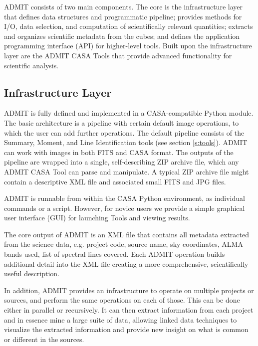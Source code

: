 \documentclass[preprint]{aastex} %
\begin{document}
ADMIT consists of two main components. The core is the infrastructure layer
that defines data structures and programmatic pipeline; provides methods
for I/O, data selection, and computation of scientifically relevant
quantities; extracts and organizes scientific metadata from the cubes; and
defines the application programming interface (API) for higher-level tools.
Built upon the infrastructure layer are the ADMIT CASA Tools that provide
advanced functionality for scientific analysis.

\subsection{ Infrastructure Layer \label{s:infrastructure} }


ADMIT is fully defined and implemented in a CASA-compatible Python module.
The basic architecture is a pipeline with certain default image operations,
to which the user can add further operations.  The default pipeline
consists of the Summary, Moment, and Line Identification tools (see section
\ref{s:tools}).  ADMIT can work with images in both FITS and CASA format.
The outputs of the pipeline are wrapped into a single, self-describing
ZIP archive file, which any ADMIT CASA Tool can parse and manipulate.
A typical ZIP archive file might contain a descriptive XML file and 
associated small FITS and JPG files.

ADMIT is runnable from within the CASA Python environment, as individual
commands or a script.  However, for novice users we provide a simple
graphical user interface (GUI) for launching Tools and viewing results.

The core output of ADMIT is an XML file that contains all metadata
extracted from the science data, e.g.  project code, source name, sky
coordinates, ALMA bands used, list of spectral lines covered.  Each ADMIT
operation builds additional detail into the XML file creating a more
comprehensive, scientifically useful description.

In addition, ADMIT provides an infrastructure to operate on multiple
projects or sources, and perform the same operations on each of those. This
can be done either in parallel or recursively. It can then extract
information from each project and in essence mine a large suite of data,
allowing linked data techniques to visualize the extracted information
and provide new insight on what is common or different in the sources.
\end{document}

